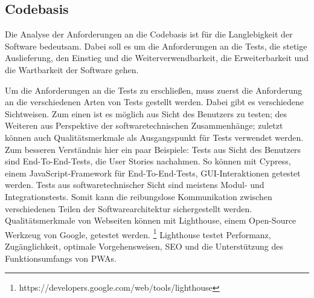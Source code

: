 \subsection{Codebasis}
\label{subsec:codebasis}
Die Analyse der Anforderungen an die Codebasis ist für die Langlebigkeit der Software bedeutsam.
Dabei soll es um die Anforderungen an die Tests, die stetige Auslieferung,
den Einstieg und die Weiterverwendbarkeit, die Erweiterbarkeit und die Wartbarkeit der Software gehen. 

Um die Anforderungen an die Tests zu erschließen, muss zuerst die Anforderung an die verschiedenen
Arten von Tests gestellt werden. Dabei gibt es verschiedene Sichtweisen. Zum einen ist es möglich aus Sicht
des Benutzers zu testen; des Weiteren aus Perspektive der softwaretechnischen Zusammenhänge; zuletzt können auch
Qualitätsmerkmale als Ausgangspunkt für Tests verwendet werden.\cite{WikiSoftwaretest} Zum besseren Verständnis hier ein
paar Beispiele: Tests aus Sicht des Benutzers sind End-To-End-Tests, die User Stories nachahmen.
So können mit Cypress, einem JavaScript-Framework für End-To-End-Tests, GUI-Interaktionen getestet werden.
Tests aus softwaretechnischer Sicht sind meistens Modul- und Integrationstests. Somit kann die reibungslose
Kommunikation zwischen verschiedenen Teilen der Softwarearchitektur sichergestellt werden. Qualitätsmerkmale
von Webseiten können mit Lighthouse, einem Open-Source Werkzeug von Google, getestet werden. \footnote{https://developers.google.com/web/tools/lighthouse}
Lighthouse testet Performanz, Zugänglichkeit, optimale Vorgehensweisen, SEO und die Unterstützung
des Funktionsumfangs von PWAs.

